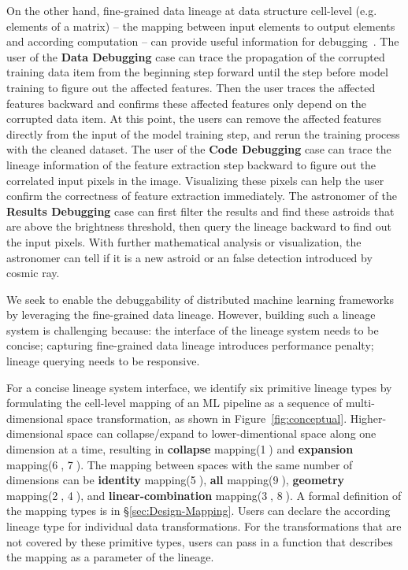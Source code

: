 \documentclass{sig-alternate}
\begin{document}
On the other hand, fine-grained data lineage at data structure cell-level (e.g. elements of a matrix) -- the mapping between
input elements to output elements and according computation -- can provide useful information for
debugging~\cite{widom04}. The user of the {\bf Data Debugging} case can trace the propagation of the corrupted training
data item from the beginning step forward until the step before model training to figure out the affected features.
Then the user traces the affected features backward and confirms these affected features only depend on the corrupted
data item. At this point, the users can remove the affected features directly from the input of the model training step, 
and rerun the training process with the cleaned dataset. The user of the {\bf Code Debugging} case can trace the lineage
information of the feature extraction step backward to figure out the correlated input pixels in the image. Visualizing
these pixels can help the user confirm the correctness of feature extraction immediately. The astronomer of the {\bf Results Debugging}
case can first filter the results and find these astroids that are above the brightness threshold, then query the lineage
backward to find out the input pixels. With further mathematical analysis or visualization, the astronomer can tell
if it is a new astroid or an false detection introduced by cosmic ray. 


We seek to enable the debuggability of distributed machine learning frameworks by leveraging the fine-grained data lineage.
However, building such a lineage system is challenging because: 
the interface of the lineage system needs to be concise;
capturing fine-grained data lineage introduces performance penalty;
lineage querying needs to be responsive.

For a concise lineage system interface, we identify six primitive lineage types by formulating the cell-level mapping 
of an ML pipeline as a sequence of multi-dimensional space transformation, as shown in Figure~\ref{fig:conceptual}.
Higher-dimensional space can collapse/expand to lower-dimentional space along one dimension at a time, 
resulting in {\bf collapse} mapping(\textcircled{1}) and {\bf expansion} mapping(\textcircled{6}, \textcircled{7}). 
The mapping between spaces with the same number of dimensions can be {\bf identity} mapping(\textcircled{5}), {\bf all} mapping(\textcircled{9}), 
{\bf geometry} mapping(\textcircled{2}, \textcircled{4}), and {\bf linear-combination} mapping(\textcircled{3}, \textcircled{8}).
A formal definition of the mapping types is in \S\ref{sec:Design-Mapping}.
Users can declare the according lineage type for individual data transformations.
For the transformations that are not covered by these primitive types, users can pass in a function that describes the
mapping as a parameter of the lineage.
\end{document}
